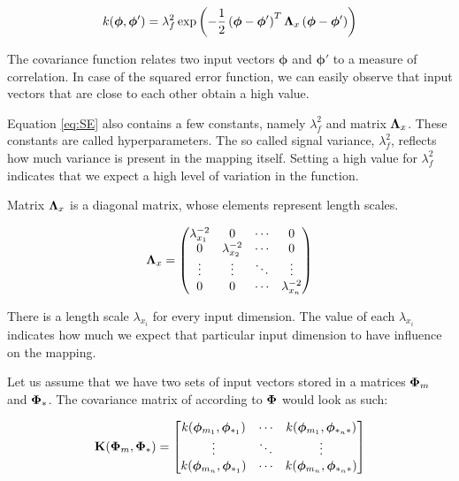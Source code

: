 \documentclass[mscThesis.tex]{subfiles}
\begin{document}
\begin{equation}
k(\bm{\phi}, \bm{\phi}') = \lambda_f^2 \exp \left(-\frac{1}{2} \left(\bm{\phi}-\bm{\phi}' \right)^T \mathbf{\Lambda}_x \left(\bm{\phi}-\bm{\phi}' \right) \right)
\label{eq:SE}
\end{equation}

The covariance function relates two input vectors $\bm{\phi}$ and $\bm{\phi}'$ to a measure of correlation. In case of the squared error function, we can easily observe that input vectors that are close to each other obtain a high value. 

Equation \ref{eq:SE} also contains a few constants, namely $\lambda_f^2$ and matrix $\mathbf{\Lambda}_x$. These constants are called hyperparameters. The so called signal variance, $\lambda_f^2$, reflects how much variance is present in the mapping itself. Setting a high value for $\lambda_f^2$ indicates that we expect a high level of variation in the function. 

Matrix $\mathbf{\Lambda}_x$ is a diagonal matrix, whose elements represent length scales. 

\begin{equation*}
\mathbf{\Lambda}_x = 
\begin{pmatrix}
  \lambda_{x_1}^{-2} & 0 & \cdots & 0 \\
  0 & \lambda_{x_2}^{-2} & \cdots & 0 \\
  \vdots  & \vdots  & \ddots & \vdots  \\
  0 &0 & \cdots & \lambda_{x_n}^{-2} 
 \end{pmatrix}
\end{equation*} 

There is a length scale $\lambda_{x_i}$ for every input dimension. The value of each $\lambda_{x_i}$ indicates how much we expect that particular input dimension to have influence on the mapping.

Let us assume that we have two sets of input vectors stored in a matrices $\mathbf{\Phi}_m$ and $\mathbf{\Phi}_{*}$. The covariance matrix of according to $\mathbf{\Phi}$ would look as such:

\begin{equation}
\mathbf{K}(\mathbf{\Phi}_{m}, \mathbf{\Phi}_{*}) = 
\begin{bmatrix}
k(\bm{\phi}_{m_1}, \bm{\phi}_{*_1}) & \cdots & k(\bm{\phi}_{m_1}, \bm{\phi}_{*_n*}) \\
\vdots & \ddots & \vdots \\
k(\bm{\phi}_{m_n}, \bm{\phi}_{*_1}) & \cdots & k(\bm{\phi}_{m_n}, \bm{\phi}_{*_n*}) 
\end{bmatrix}
\end{equation}
\end{document}
